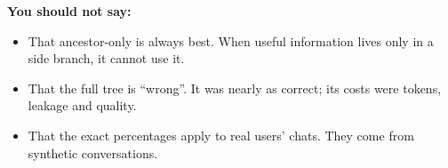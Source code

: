\textbf{You should not say:}
\begin{itemize}
\item That ancestor-only is always best. When useful information lives only in a side branch, it cannot use it.
\item That the full tree is ``wrong''. It was nearly as correct; its costs were tokens, leakage and quality.
\item That the exact percentages apply to real users' chats. They come from synthetic conversations.
\end{itemize}
